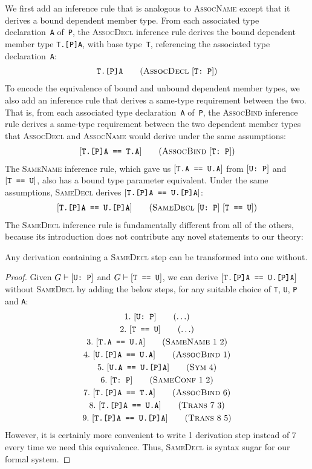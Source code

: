 \documentclass[../generics]{subfiles}
\begin{document}
We first add an inference rule that is analogous to \textsc{AssocName} except that it derives a bound dependent member type. From each associated type declaration~\texttt{A} of~\texttt{P}, the \textsc{AssocDecl} inference rule derives the bound dependent member type \texttt{T.[P]A}, with base type~\texttt{T}, referencing the associated type declaration~\texttt{A}:
\begin{gather*}
\AssocDeclStepDef
\end{gather*}
To encode the equivalence of bound and unbound dependent member types, we also add an inference rule that derives a same-type requirement between the two. That is, from each associated type declaration~\texttt{A} of~\texttt{P}, the \textsc{AssocBind} inference rule derives a same-type requirement between the two dependent member types that \textsc{AssocDecl} and \textsc{AssocName} would derive under the same assumptions:
\begin{gather*}
\AssocBindStepDef
\end{gather*}
The \textsc{SameName} inference rule, which gave us $[\texttt{T.A == U.A}]$ from $[\texttt{U:~P}]$ and $[\texttt{T == U}]$, also has a bound type parameter equivalent. Under the same assumptions, \textsc{SameDecl} derives $[\texttt{T.[P]A == U.[P]A}]$:
\begin{gather*}
\SameDeclStepDef
\end{gather*}
The \textsc{SameDecl} inference rule is fundamentally different from all of the others, because its introduction does not contribute any novel statements to our theory:
\begin{proposition}
Any derivation containing a \textsc{SameDecl} step can be transformed into one without.
\end{proposition}
\begin{proof}
Given $G\vdash[\texttt{U:~P}]$ and $G\vdash[\texttt{T == U}]$, we can derive $[\texttt{T.[P]A == U.[P]A}]$ without \textsc{SameDecl} by adding the below steps, for any suitable choice of \texttt{T}, \texttt{U}, \texttt{P} and \texttt{A}:
\begin{gather*}
\AnyStep{\ConfReq{U}{P}}{1}\\
\AnyStep{\SameReq{T}{U}}{2}\\
\SameNameStep{1}{2}{T.A}{U.A}{3}\\
\AssocBindStep{1}{U.[P]A}{U.A}{4}\\
\SymStep{4}{U.A}{U.[P]A}{5}\\
\SameConfStep{1}{2}{T}{P}{6}\\
\AssocBindStep{6}{T.[P]A}{T.A}{7}\\
\TransStep{7}{3}{T.[P]A}{U.A}{8}\\
\TransStep{8}{5}{T.[P]A}{U.[P]A}{9}
\end{gather*}
However, it is certainly more convenient to write 1 derivation step instead of 7 every time we need this equivalence. Thus, \textsc{SameDecl} is syntax sugar for our formal system.
\end{proof}
\end{document}
